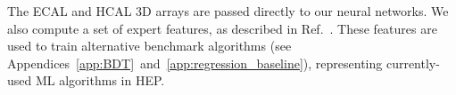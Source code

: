 
The ECAL and HCAL 3D arrays are passed directly to our neural networks. We also compute a set of expert features, as described in Ref.~\cite{NIPS}. These features are used to train alternative benchmark algorithms (see Appendices~\ref{app:BDT}~and~\ref{app:regression_baseline}), representing currently-used ML algorithms in HEP.